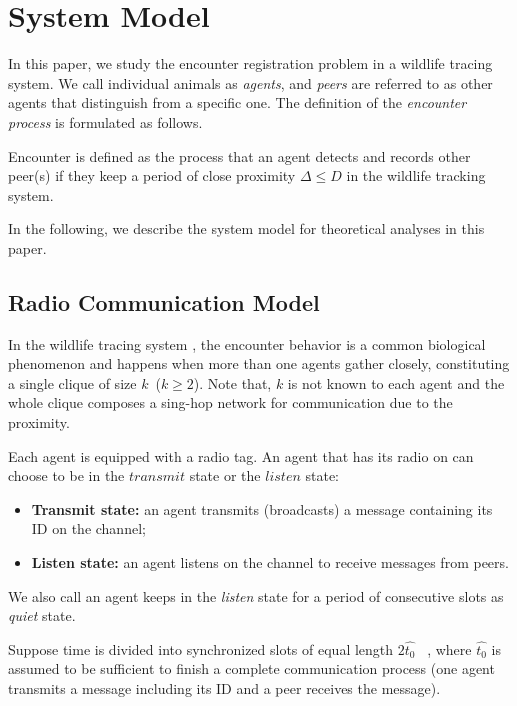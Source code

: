 \section{System Model}
\label{sectionmodel}

In this paper, we study the encounter registration problem in a wildlife 
tracing system. We call individual animals as \emph{agents}, 
and \emph{peers} are referred to as other agents that distinguish from 
a specific one.
The definition of the \emph{encounter process} is formulated as follows.
\begin{definition}
Encounter is defined as the process that 
an agent detects and records other peer(s) if they keep a period of 
close proximity $\Delta \leq D$
in the wildlife tracking system. 
\end{definition}

In the following, we describe the system model for theoretical analyses in this paper.



\subsection{Radio Communication Model}


In the  wildlife tracing system {\sysname}, the encounter behavior  
is a common biological phenomenon and
happens when more than one agents gather closely, constituting a 
single clique of size $k$~($k \geq 2$).
Note that, $k$ is not known to each agent and the whole 
clique composes a sing-hop network for communication due to the proximity. 

Each agent is equipped with a radio tag. 
An agent that has its radio on can choose to be in the $transmit$ state
or the $listen$ state:
\begin{itemize}
\item \textbf{Transmit state:} an agent transmits (broadcasts) 
a message containing its ID on the channel;
\item  \textbf{Listen state:} an agent listens on 
the channel to receive messages from peers.
\end{itemize}
We also call an agent keeps in the \emph{listen} state for a period of consecutive slots 
as \emph{quiet} state.

Suppose time is divided into synchronized slots of equal 
length $2\hat{t_0}$~\cite{Xu2005Lightweight, Sivrikaya2004Time}
, where $\hat{t_0}$ is assumed to be sufficient to finish a complete
communication process (one agent transmits a message including its ID and
a peer receives the message).

